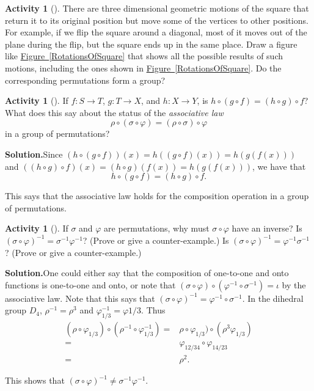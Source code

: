 \documentclass[10pt,]{book}
\theoremstyle{plain}
\theoremstyle{definition}
\newtheorem{activity}[project]{Activity}
\numberwithin{equation}{chapter}
\newcommand{\amp}{&}
\begin{document}
\begin{activity}[]\label{dihedral1}
There are three dimensional geometric motions of the square that return it to its original position but move some of the vertices to other positions. For example, if we flip the square around a diagonal, most of it moves out of the plane during the flip, but the square ends up in the same place. Draw a figure like \hyperref[RotationsOfSquare]{Figure~\ref{RotationsOfSquare}} that shows all the possible results of such motions, including the ones shown in \hyperref[RotationsOfSquare]{Figure~\ref{RotationsOfSquare}}. Do the corresponding permutations form a group?%
\end{activity}
\begin{activity}[]\label{activity-258}
If \(f:S\rightarrow T\), \(g:T\rightarrow X\), and \(h:X \rightarrow Y\), is \(h\circ(g\circ f) = (h\circ g)\circ f\)? What does this say about the status of the \emph{associative law}%
\begin{equation*}
\rho\circ(\sigma\circ \varphi) = (\rho\circ \sigma)\circ\varphi
\end{equation*}
in a group of permutations?%
\par\medskip\noindent%
\textbf{Solution.}\quad Since \((h\circ(g\circ f)) (x) = h((g\circ f)(x)) = h(g(f(x)))\) and \(((h\circ
g)\circ f) (x) = (h\circ g)(f(x)) = h(g(f(x)))\), we have that%
\begin{equation*}
h\circ (g\circ f) =
(h\circ g)\circ f.
\end{equation*}
%
\par
This says that the associative law holds for the composition operation in a group of permutations.%
\end{activity}
\begin{activity}[]\label{activity-259}
If \(\sigma\) and \(\varphi\) are permutations, why must \(\sigma\circ\varphi\) have an inverse? Is \((\sigma\circ\varphi)^{-1}=
\sigma^{-1}\varphi^{-1}\)? (Prove or give a counter-example.) Is \((\sigma\circ\varphi)^{-1}=
\varphi^{-1}\sigma^{-1}\)? (Prove or give a counter-example.)%
\par\medskip\noindent%
\textbf{Solution.}\quad One could either say that the composition of one-to-one and onto functions is one-to-one and onto, or note that \((\sigma\circ\varphi)\circ (\varphi^{-1}\circ
\sigma^{-1}) =\iota\) by the associative law. Note that this says that \((\sigma \circ
\varphi)^{-1}= \varphi^{-1}\circ \sigma^{-1}\). In the dihedral group \(D_4\), \(\rho^{-1}= \rho^3\) and \(\varphi_{1/3}^{-1} = \varphi{1/3}\). Thus%
\begin{align*}
(\rho\circ \varphi_{1/3})\circ (\rho^{-1}\circ
\varphi_{1/3}^{-1}) =\amp \rho\circ
\varphi_{1/3})\circ(\rho^3\varphi_{1/3})\\
=\amp \varphi_{12/34}\circ \varphi_{14/23}\\
=\amp \rho^2.
\end{align*}
%
\par
This shows that \((\sigma\circ\varphi)^{-1}\not=
\sigma^{-1}\varphi^{-1}\).%
\end{activity}
\end{document}
